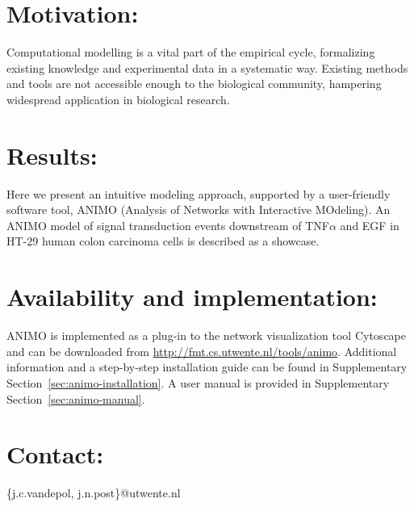 \section{Motivation:}
Computational modelling is a vital part of the empirical cycle, formalizing
existing knowledge and experimental data in a systematic way. Existing methods
and tools are not accessible enough to the biological community, hampering
widespread application in biological research.
\section{Results:}
Here we present an intuitive modeling approach, supported
by a user-friendly software tool, ANIMO (Analysis of Networks with Interactive
MOdeling). An ANIMO model of signal transduction events
downstream of TNF$\alpha$ and EGF in HT-29 human colon carcinoma
cells is described as a showcase.
\section{Availability and implementation:}
ANIMO is implemented as a plug-in to the network visualization tool Cytoscape
and can be downloaded from \url{http://fmt.cs.utwente.nl/tools/animo}.
Additional information and a step-by-step installation guide can be found
in Supplementary Section~\ref{sec:animo-installation}. A user manual is 
provided in Supplementary Section~\ref{sec:animo-manual}.
\section{Contact:} \{j.c.vandepol, j.n.post\}@utwente.nl
